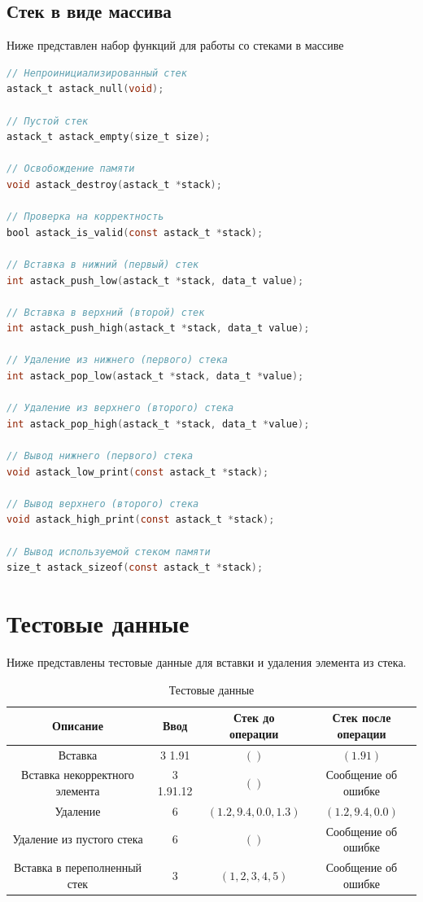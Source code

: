 \subsection{Стек в виде массива}

Ниже представлен набор функций для работы со стеками в массиве

\begin{lstlisting}[language=C,caption=Набор функций для стека-массива.]
// Непроинициализированный стек
astack_t astack_null(void);

// Пустой стек
astack_t astack_empty(size_t size);

// Освобождение памяти
void astack_destroy(astack_t *stack);

// Проверка на корректность
bool astack_is_valid(const astack_t *stack);

// Вставка в нижний (первый) стек
int astack_push_low(astack_t *stack, data_t value);

// Вставка в верхний (второй) стек
int astack_push_high(astack_t *stack, data_t value);

// Удаление из нижнего (первого) стека
int astack_pop_low(astack_t *stack, data_t *value);

// Удаление из верхнего (второго) стека
int astack_pop_high(astack_t *stack, data_t *value);

// Вывод нижнего (первого) стека
void astack_low_print(const astack_t *stack);

// Вывод верхнего (второго) стека
void astack_high_print(const astack_t *stack);

// Вывод используемой стеком памяти
size_t astack_sizeof(const astack_t *stack);
\end{lstlisting}

\section{Тестовые данные}

Ниже представлены тестовые данные для вставки и удаления элемента из стека.

\begin{table}
	\caption{Тестовые данные}
	\begin{center}
		\begin{tabular}{|c|c|c|c|}
			\hline
			Описание & Ввод & Стек до операции & Стек после операции \\
			\hline
			Вставка & 3 1.91 & $()$ & $(1.91)$ \\
			Вставка некорректного элемента & 3 1.91.12 & $()$ & Сообщение об ошибке \\
			Удаление & 6 & $(1.2, 9.4, 0.0, 1.3)$ & $(1.2, 9.4, 0.0)$ \\
			Удаление из пустого стека & 6 & $()$ & Сообщение об ошибке \\
			Вставка в переполненный стек & 3 & $(1, 2, 3, 4, 5)$ & Сообщение об ошибке \\
			\hline
		\end{tabular}
	\end{center}
\end{table}

